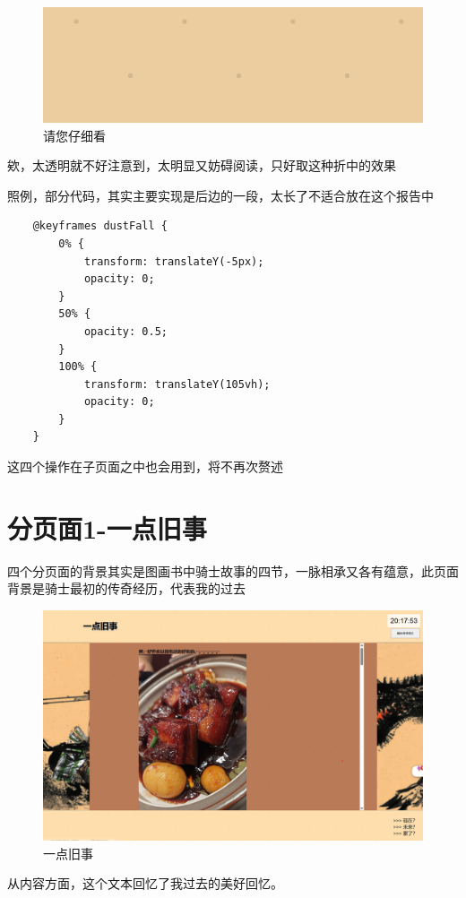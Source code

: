 \documentclass[supercite]{Experimental_Report}
\theoremstyle{definition}
\begin{document}
\begin{figure}[htb] %
	\begin{center}
		\includegraphics[scale=0.40]{images/zhuye-4.png}
		\caption{请您仔细看}
		\label{fig2-6}
	\end{center}
\end{figure}
欸，太透明就不好注意到，太明显又妨碍阅读，只好取这种折中的效果

照例，部分代码，其实主要实现是后边的一段，太长了不适合放在这个报告中
\begin{verbatim}
	@keyframes dustFall {
		0% {
			transform: translateY(-5px);
			opacity: 0;
		}
		50% {
			opacity: 0.5;
		}
		100% {
			transform: translateY(105vh);
			opacity: 0;
		}
	}
\end{verbatim}

这四个操作在子页面之中也会用到，将不再次赘述

\newpage

\section{分页面1-一点旧事}
四个分页面的背景其实是图画书中骑士故事的四节，一脉相承又各有蕴意，此页面背景是骑士最初的传奇经历，代表我的过去
\begin{figure}[htb]
	\begin{center}
		\includegraphics[scale=0.40]{images/jiushi-1.png}
		\caption{一点旧事}
		\label{fig3-1}
	\end{center}
\end{figure}
从内容方面，这个文本回忆了我过去的美好回忆。
\end{document}
